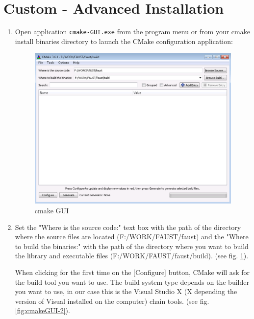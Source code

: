 \section{Custom - Advanced Installation}\label{sec:WinCustomInstall}
\begin{enumerate}
\item Open application \texttt{cmake-GUI.exe} from the program menu or from your cmake install binaries directory  to launch the CMake configuration application:

\begin{figure}[!h] %
\centering
\includegraphics[scale=0.5]{images/cmakeGUI-1-eps-converted-to.pdf}
\caption{cmake GUI}
\label{fig:cmakeGUI-1}
\end{figure}

\item Set the "Where is the source code:" text box with the path of the directory where the source files are located (F:/WORK/FAUST/faust) and the "Where to build the binaries:" with the path of the directory where you want to build the library and executable files (F:/WORK/FAUST/faust/build). (see fig.  \ref{fig:cmakeGUI-1}).

When clicking for the first time on the [Configure] button, CMake will ask for the build tool you want to use. The build system type depends on the builder you want to use, in our case this is the Visual Studio X (X depending the version of Visual installed on the computer) chain tools. (see fig. \ref{fig:cmakeGUI-2}).



\end{enumerate}
